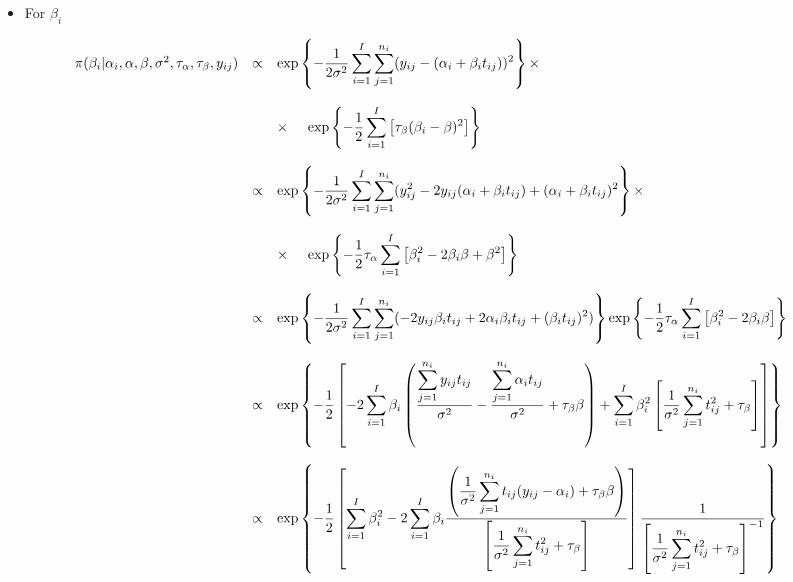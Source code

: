 \documentclass{article}
\begin{document}
\begin{itemize}
\item For $\beta_i$
\end{itemize}
\begin{equation*}
\begin{array}{lcl ll }

\pi(\beta_i|\alpha_i, \alpha, \beta, \sigma^2, \tau_\alpha, \tau_\beta, y_{ij}) & \propto & \mbox{exp}\left\{ - \dfrac{1}{2\sigma^2}\displaystyle\sum_{i=1}^{I}\displaystyle\sum_{j=1}^{n_i}(y_{ij} - (\alpha_i + \beta_i t_{ij}))^2\right\} \times \\ \\

& & \times \hspace{0.5cm} \mbox{exp}\left\{ - \dfrac{1}{2} 
\displaystyle\sum_{i=1}^{I} \left[ \tau_{\beta}(\beta_{i} - \beta)^2 \right]\right\} \\ \\

& \propto & \mbox{exp}\left\{ - \dfrac{1}{2\sigma^2}\displaystyle\sum_{i=1}^{I}\displaystyle\sum_{j=1}^{n_i}(y_{ij}^2 -2y_{ij}(\alpha_i + \beta_i t_{ij}) + (\alpha_i + \beta_i t_{ij})^2\right\} \times \\ \\

& & \times \hspace{0.5cm} \mbox{exp}\left\{ - \dfrac{1}{2} \tau_{\alpha}
\displaystyle\sum_{i=1}^{I} \left[\beta_{i}^2 -2\beta_{i}\beta + \beta^2 \right]\right\} \\ \\

& \propto & \mbox{exp}\left\{ - \dfrac{1}{2\sigma^2}\displaystyle\sum_{i=1}^{I}\displaystyle\sum_{j=1}^{n_i}( -2y_{ij}\beta_it_{ij} + 2\alpha_i\beta_i t_{ij} + (\beta_i t_{ij})^2)\right\} \mbox{exp}\left\{ - \dfrac{1}{2} \tau_{\alpha}
\displaystyle\sum_{i=1}^{I} \left[\beta_{i}^2 -2\beta_{i}\beta \right]\right\} \\ \\

& \propto & \mbox{exp}\left\{ - \dfrac{1}{2} \left[ -2 \displaystyle\sum_{i=1}^{I} \beta_i \left(\dfrac{\displaystyle\sum_{j=1}^{n_i} y_{ij}t_{ij}}{\sigma^2} - \dfrac{\displaystyle\sum_{j=1}^{n_i} \alpha_{i}t_{ij}}{\sigma^2} + \tau_\beta \beta \right) +  \displaystyle\sum_{i=1}^{I} \beta_i^2 \left[ \dfrac{1}{\sigma^2}\displaystyle\sum_{j=1}^{n_i}t_{ij}^2 + \tau_\beta \right]\right]\right\} \\ \\

& \propto & \mbox{exp}\left\{ - \dfrac{1}{2} \left[ \displaystyle\sum_{i=1}^{I} \beta_i^2 -2 \displaystyle\sum_{i=1}^{I} \beta_i \dfrac{\left(\dfrac{1}{\sigma^2}\displaystyle\sum_{j=1}^{n_i} t_{ij} (y_{ij} - \alpha_{i}) + \tau_\beta \beta \right)}{\left[ \dfrac{1}{\sigma^2}\displaystyle\sum_{j=1}^{n_i}t_{ij}^2 + \tau_\beta \right]} 
\right] \dfrac{1}{\left[ \dfrac{1}{\sigma^2}\displaystyle\sum_{j=1}^{n_i}t_{ij}^2 + \tau_\beta \right]^{-1}}\right\} \\ \\

 \end{array}
\end{equation*}
\end{document}
